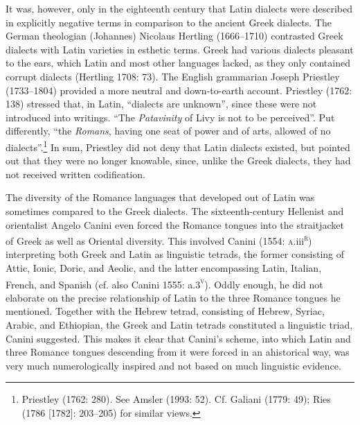 \begin{styleStandard}
It was, however, only in the eighteenth century that Latin dialects were described in explicitly negative terms in comparison to the ancient Greek dialects. The German theologian (Johannes) Nicolaus Hertling (1666–1710) contrasted Greek dialects with Latin varieties in esthetic terms. Greek had various dialects pleasant to the ears, which Latin and most other languages lacked, as they only contained corrupt dialects (Hertling 1708: 73). The English grammarian Joseph Priestley (1733–1804) provided a more neutral and down-to-earth account. Priestley (1762: 138) stressed that, in Latin, “dialects are unknown”, since these were not introduced into writings. “The \textit{Patavinity} of Livy is not to be perceived”. Put differently, “the \textit{Romans}, having one seat of power and of arts, allowed of no dialects”.\footnote{ Priestley (1762: 280). See Amsler (1993: 52). Cf. Galiani (1779: 49); Ries (1786 [1782]: 203–205) for similar views.} In sum, Priestley did not deny that Latin dialects existed, but pointed out that they were no longer knowable, since, unlike the Greek dialects, they had not received written codification.
\end{styleStandard}

\begin{styleStandard}
The diversity of the Romance languages that developed out of Latin was sometimes compared to the Greek dialects. The sixteenth-century Hellenist and orientalist Angelo Canini even forced the Romance tongues into the straitjacket of Greek as well as Oriental diversity. This involved Canini (1554: \textsc{a}.iii\textsc{\textsuperscript{r}}) interpreting both Greek and Latin as linguistic tetrads, the former consisting of Attic, Ionic, Doric, and Aeolic, and the latter encompassing Latin, Italian, French, and Spanish (cf. also Canini 1555: a.3\textsc{\textsuperscript{v}}). Oddly enough, he did not elaborate on the precise relationship of Latin to the three Romance tongues he mentioned. Together with the Hebrew tetrad, consisting of Hebrew, Syriac, Arabic, and Ethiopian, the Greek and Latin tetrads constituted a linguistic triad, Canini suggested. This makes it clear that Canini’s scheme, into which Latin and three Romance tongues descending from it were forced in an ahistorical way, was very much numerologically inspired and not based on much linguistic evidence.
\end{styleStandard}

